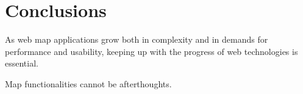 \section{Conclusions}

As web map applications grow both in complexity and in demands for performance and usability,
keeping up with the progress of web technologies is essential.

Map functionalities cannot be afterthoughts.
